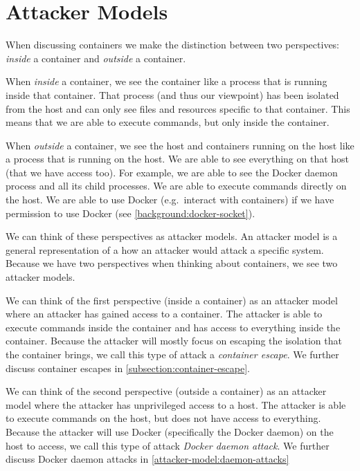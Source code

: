 \chapter{Attacker Models}\label{chapter:attack-surface-models}
When discussing containers we make the distinction between two perspectives: \emph{inside} a container and \emph{outside} a container.

When \emph{inside} a container, we see the container like a process that is running inside that container. That process (and thus our viewpoint) has been isolated from the host and can only see files and resources specific to that container. This means that we are able to execute commands, but only inside the container.

When \emph{outside} a container, we see the host and containers running on the host like a process that is running on the host. We are able to see everything on that host (that we have access too). For example, we are able to see the Docker daemon process and all its child processes. We are able to execute commands directly on the host. We are able to use Docker (e.g.\ interact with containers) if we have permission to use Docker (see \autoref{background:docker-socket}).

\medskip

We can think of these perspectives as attacker models. An attacker model is a general representation of a how an attacker would attack a specific system. Because we have two perspectives when thinking about containers, we see two attacker models.

We can think of the first perspective (inside a container) as an attacker model where an attacker has gained access to a container. The attacker is able to execute commands inside the container and has access to everything inside the container. Because the attacker will mostly focus on escaping the isolation that the container brings, we call this type of attack a \emph{container escape}. We further discuss container escapes in \autoref{subsection:container-escape}.

We can think of the second perspective (outside a container) as an attacker model where the attacker has unprivileged access to a host. The attacker is able to execute commands on the host, but does not have access to everything. Because the attacker will use Docker (specifically the Docker daemon) on the host to access, we call this type of attack \emph{Docker daemon attack}. We further discuss Docker daemon attacks in \autoref{attacker-model:daemon-attacks}

